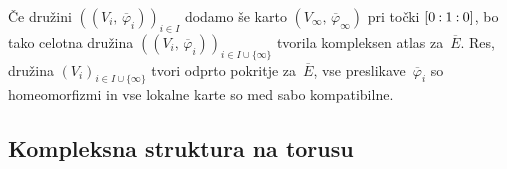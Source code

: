 \documentclass[mat1]{fmfdelo}
\newcommand{\C}{\mathbb C}
\newcommand{\PC}{P^2(\mathbb C)}
\newcommand{\inv}{^{-1}}
\newcommand{\pcoor}[1]{%
\begingroup\lccode`~=`: \lowercase{\endgroup
\edef~}{\mathbin{\mathchar\the\mathcode`:}\nobreak}%
\left[%
\begingroup
\mathcode`:=\string"8000
#1%
\endgroup
\right]%
}
\newcommand{\olsi}[1]{\,\overline{\!{#1}}} %
\theoremstyle{definition}
\begin{document}


Če družini $((V_i, \olsi{\varphi}_i))_{i \in I}$ dodamo še karto $(V_\infty, \olsi{\varphi}_\infty)$ pri točki $\pcoor{0 : 1 : 0}$, bo tako celotna družina $((V_i,\olsi{\varphi}_i))_{i \in I \cup \{\infty\}}$ tvorila kompleksen atlas za $\olsi{E}$. Res, družina $(V_i)_{i \in I \cup \{\infty\}}$ tvori odprto pokritje za $\olsi{E}$, vse preslikave $\olsi{\varphi}_i$ so homeomorfizmi in vse lokalne karte so med sabo kompatibilne. 












\subsection{Kompleksna struktura na torusu}
\break


\end{document}
